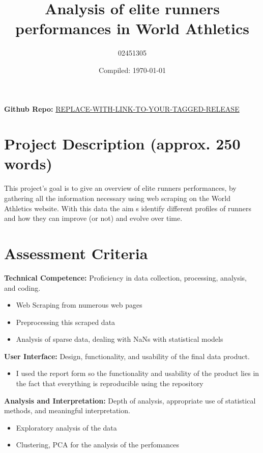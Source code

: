 \documentclass[a4paper, 12pt]{article}
\title{Analysis of elite runners performances in World Athletics}
\author{02451305}
\date{Compiled: \today}
\begin{document}
\maketitle

\textbf{Github Repo:} \href{https://github.com/zakvarty/eds-notes-quarto/releases/tag/v1.2.0-alpha}{REPLACE-WITH-LINK-TO-YOUR-TAGGED-RELEASE}

\section{Project Description (approx. 250 words)}


This project's goal is to give an overview of elite runners performances, by gathering all the information necessary using web 
scraping on the World Athletics website. With this data the aim s identify different profiles of runners and how they can 
improve (or not) and evolve over time.


\pagebreak

\section{Assessment Criteria}


\textbf{Technical Competence:} Proficiency in data collection, processing, analysis, and coding.

\begin{itemize}
    \item Web Scraping from numerous web pages
    \item Preprocessing this scraped data
    \item Analysis of sparse data, dealing with NaNs with statistical models
\end{itemize}

\textbf{User Interface:} Design, functionality, and usability of the final data product.

\begin{itemize}
    \item I used the report form so the functionality and usability of the product lies in the fact that everything is reproducible using the repository
\end{itemize}

\textbf{Analysis and Interpretation:} Depth of analysis, appropriate use of statistical methods, and meaningful interpretation.

\begin{itemize}
    \item Exploratory analysis of the data
    \item Clustering, PCA for the analysis of the perfomances
\end{itemize}
\end{document}
